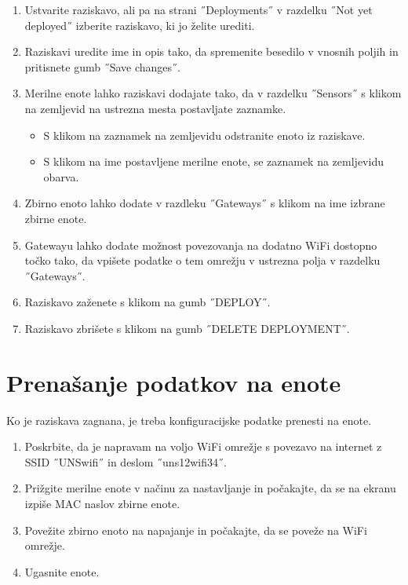 \documentclass[a4paper, 12pt]{book}
\begin{document}
\begin{enumerate}
    \item Ustvarite raziskavo, ali pa na strani ˝Deployments˝ v razdelku ˝Not yet deployed˝ izberite raziskavo, ki jo želite urediti.
    \item Raziskavi uredite ime in opis tako, da spremenite besedilo v vnosnih poljih in pritisnete gumb ˝Save changes˝.
    \item Merilne enote lahko raziskavi dodajate tako, da v razdelku ˝Sensors˝ s klikom na zemljevid na ustrezna mesta postavljate zaznamke.
    \begin{itemize}
        \item S klikom na zaznamek na zemljevidu odstranite enoto iz raziskave. 
        \item S klikom na ime postavljene merilne enote, se zaznamek na zemljevidu obarva.
        \end{itemize}
    \item Zbirno enoto lahko dodate v razdleku ˝Gateways˝ s klikom na ime izbrane zbirne enote.
    \item Gatewayu lahko dodate možnost povezovanja na dodatno WiFi dostopno točko tako, da vpišete podatke o tem omrežju v ustrezna polja v razdelku ˝Gateways˝.
    \item Raziskavo zaženete s klikom na gumb ˝DEPLOY˝.
    \item Raziskavo zbrišete s klikom na gumb ˝DELETE DEPLOYMENT˝.
    \end{enumerate}
    
    \section{Prenašanje podatkov na enote}
    
    Ko je raziskava zagnana, je treba konfiguracijske podatke prenesti na enote.
    
    \begin{enumerate}
        \item Poskrbite, da je napravam na voljo WiFi omrežje s povezavo na internet z SSID ˝UNSwifi˝ in deslom ˝uns12wifi34˝.
        \item Prižgite merilne enote v načinu za nastavljanje in počakajte, da se na ekranu izpiše MAC naslov zbirne enote.
        \item Povežite zbirno enoto na napajanje in počakajte, da se poveže na WiFi omrežje. 
        \item Ugasnite enote.
    \end{enumerate}
    
\end{document}
